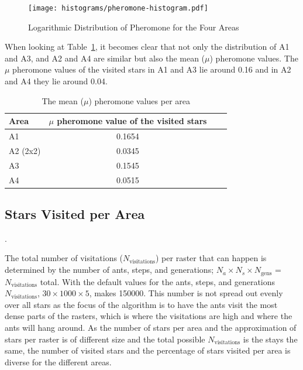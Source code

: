 \begin{figure}[H]
    \centering
    \texttt{[image: histograms/pheromone-histogram.pdf]}
    \caption{\label{fig:areas-hist-pheromone} Logarithmic Distribution of Pheromone for the Four Areas}
\end{figure}



When looking at Table~\ref{tb:pheromone-mean-areas}, it becomes clear that not only the distribution of A1 and A3, and A2 and A4 are similar but also the mean ($\mu$) pheromone values. The $\mu$ pheromone values of the visited stars in A1 and A3 lie around \num{0.16} and in A2 and A4 they lie around \num{0.04}.


\begin{table}[H]
    \centering
    \begin{tabular}{l c c c }
        \toprule
        Area     & $\mu$ pheromone value of the visited stars \\
        \midrule
        A1       & 0.1654                                     \\
        A2 (2x2) & 0.0345                                     \\
        A3       & 0.1545                                     \\
        A4       & 0.0515                                     \\
        \bottomrule
    \end{tabular}
    \caption{The mean ($\mu$) pheromone values per area}
    \label{tb:pheromone-mean-areas}
\end{table}


\subsection{Stars Visited per Area}

.

The total number of visitations ($N_{\text{visitations}}$) per raster that can happen is determined by the number of ants, steps, and generations; $N_{a} \times N_{s} \times N_{\text{gens}}$ = $N_{\text{visitations}}$ total. With the default values for the ants, steps, and generations $N_{\text{visitations}}$, $30 \times \num{1000} \times 5$, makes \num{150000}. This number is not spread out evenly over all stars as the focus of the algorithm is to have the ants visit the most dense parts of the rasters, which is where the visitations are high and where the ants will hang around. As the number of stars per area and the approximation of stars per raster is of different size and the total possible $N_{\text{visitations}}$ is the stays the same, the number of visited stars and the percentage of stars visited per area is diverse for the different areas.


